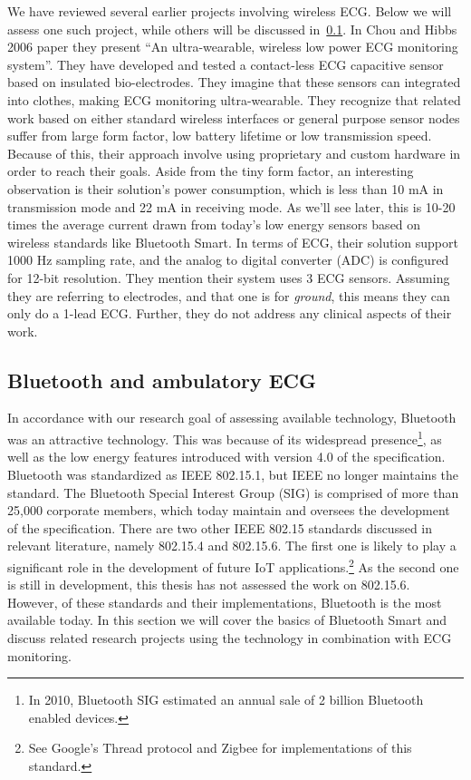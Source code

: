We have reviewed several earlier projects involving wireless ECG. Below we will assess one such project, while others will be discussed in~\ref{sub:bluetooth}. In Chou and Hibbs 2006 paper \cite{ChulsungPark:2006tf} they present ``An ultra-wearable, wireless low power ECG monitoring system''. They have developed and tested a contact-less ECG capacitive sensor based on insulated bio-electrodes. They imagine that these sensors can integrated into clothes, making ECG monitoring ultra-wearable. They recognize that related work based on either standard wireless interfaces or general purpose sensor nodes suffer from large form factor, low battery lifetime or low transmission speed. Because of this, their approach involve using proprietary and custom hardware in order to reach their goals. Aside from the tiny form factor, an interesting observation is their solution's power consumption, which is less than 10 mA in transmission mode and 22 mA in receiving mode. As we'll see later, this is 10-20 times the average current drawn from today's low energy sensors based on wireless standards like Bluetooth Smart. In terms of ECG, their solution support 1000 Hz sampling rate, and the analog to digital converter (ADC) is configured for 12-bit resolution. They mention their system uses 3 ECG sensors. Assuming they are referring to electrodes, and that one is for \emph{ground}, this means they can only do a 1-lead ECG. Further, they do not address any clinical aspects of their work.


\subsection{Bluetooth and ambulatory ECG} %
\label{sub:bluetooth}

In accordance with our research goal of assessing available technology, Bluetooth was an attractive technology. This was because of its widespread presence\footnote{ In 2010, Bluetooth SIG estimated an annual sale of 2 billion Bluetooth enabled devices.}, as well as the low energy features introduced with version 4.0 of the specification. Bluetooth was standardized as IEEE 802.15.1, but IEEE no longer maintains the standard. The Bluetooth Special Interest Group (SIG) is comprised of more than 25,000 corporate members, which today maintain and oversees the development of the specification. There are two other IEEE 802.15 standards discussed in relevant literature, namely 802.15.4 and 802.15.6. The first one is likely to play a significant role in the development of future IoT applications.\footnote{ See Google's Thread protocol and Zigbee for implementations of this standard.} As the second one is still in development, this thesis has not assessed the work on 802.15.6. However, of these standards and their implementations, Bluetooth is the most available today. In this section we will cover the basics of Bluetooth Smart and discuss related research projects using the technology in combination with ECG monitoring.

